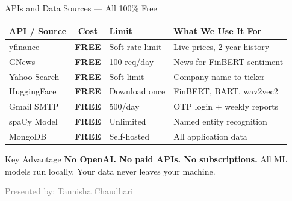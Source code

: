 \documentclass[aspectratio=169, 11pt]{beamer}
\begin{document}
\begin{frame}{APIs and Data Sources --- All 100\% Free}
\begin{center}
\renewcommand{\arraystretch}{1.25}
\small
\begin{tabular}{l c l l}
\toprule
\textbf{API / Source} & \textbf{Cost} & \textbf{Limit} & \textbf{What We Use It For} \\
\midrule
yfinance & \textcolor{emerald}{\textbf{FREE}} & Soft rate limit & Live prices, 2-year history \\
GNews & \textcolor{emerald}{\textbf{FREE}} & 100 req/day & News for FinBERT sentiment \\
Yahoo Search & \textcolor{emerald}{\textbf{FREE}} & Soft limit & Company name to ticker \\
HuggingFace & \textcolor{emerald}{\textbf{FREE}} & Download once & FinBERT, BART, wav2vec2 \\
Gmail SMTP & \textcolor{emerald}{\textbf{FREE}} & 500/day & OTP login + weekly reports \\
spaCy Model & \textcolor{emerald}{\textbf{FREE}} & Unlimited & Named entity recognition \\
MongoDB & \textcolor{emerald}{\textbf{FREE}} & Self-hosted & All application data \\
\bottomrule
\end{tabular}
\end{center}

\vspace{0.3cm}
\begin{exampleblock}{Key Advantage}
\textbf{No OpenAI. No paid APIs. No subscriptions.} All ML models run locally. Your data never leaves your machine.
\end{exampleblock}
\vfill
{\tiny\textcolor{gray}{Presented by: Tannisha Chaudhari}}
\end{frame}
\end{document}
